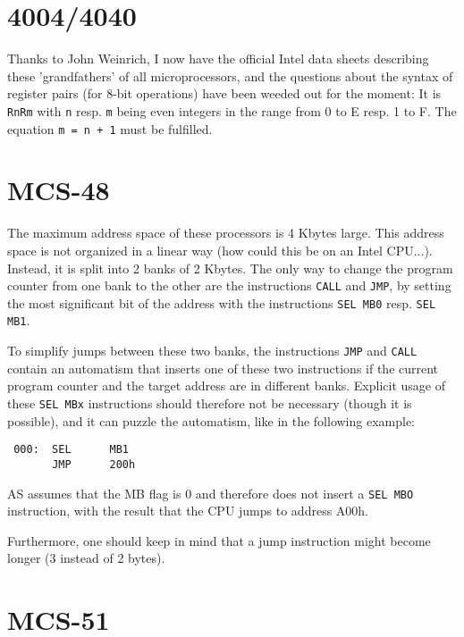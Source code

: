 \documentclass[12pt,twoside]{report}
\newcommand{\tty}[1]{{\tt #1}}
\begin{document}

\section{4004/4040}

Thanks to John Weinrich, I now have the official Intel data sheets
describing these 'grandfathers' of all microprocessors, and the questions
about the syntax of register pairs (for 8-bit operations) have been weeded
out for the moment: It is \tty{RnRm} with \tty{n} resp. \tty{m} being even
integers in the range from 0 to E resp. 1 to F.  The equation {\tt m = n +
1} must be fulfilled.


\section{MCS-48}

The maximum address space of these processors is 4 Kbytes large.  This
address space is not organized in a linear way (how could this be on an
Intel CPU...).  Instead, it is split into 2 banks of 2 Kbytes.  The only
way to change the program counter from one bank to the other are the
instructions \tty{CALL} and \tty{JMP}, by setting the most significant bit
of the address with the instructions \tty{SEL MB0} resp. \tty{SEL MB1}.

To simplify jumps between these two banks, the instructions \tty{JMP} and
\tty{CALL} contain an automatism that inserts one of these two instructions
if the current program counter and the target address are in
different banks.  Explicit usage of these \tty{SEL MBx} instructions should
therefore not be necessary (though it is possible), and it can puzzle
the automatism, like in the following example:
\begin{verbatim}
 000:  SEL      MB1
       JMP      200h
\end{verbatim}
AS assumes that the MB flag is 0 and therefore does not insert a \tty{SEL
MBO} instruction, with the result that the CPU jumps to address
A00h.

Furthermore, one should keep in mind that a jump instruction might
become longer (3 instead of 2 bytes).


\section{MCS-51}
\end{document}
